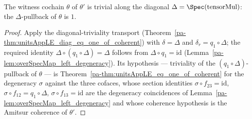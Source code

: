 \begin{theorem}
  \label{pa-thm:witnessAppLE_diag_eq_one}
  \leanok

  The witness cochain \(\theta\) of \(\theta'\) is trivial along the diagonal \(\Delta =
  \Spec(\mathrm{tensorMul})\): the \(\Delta\)-pullback of \(\theta\) is \(1\).
\end{theorem}
\begin{proof}
  \leanok
  Apply the diagonal-triviality transport (Theorem~\ref{pa-thm:unitsAppLE_diag_eq_one_of_coherent})
  with \(\delta = \Delta\) and \(\delta_r = q_1 \circ \Delta\); the required identity
  \(\Delta \circ (q_1 \circ \Delta) = \Delta\) follows from \(\Delta \circ q_1 = \mathrm{id}\)
  (Lemma~\ref{pa-lem:overSpecMap_left_degeneracy}). Its hypothesis — triviality of the
  \((q_1 \circ \Delta)\)-pullback of \(\theta\) — is
  Theorem~\ref{pa-thm:unitsAppLE_eq_one_of_coherent} for the degeneracy \(\sigma\) against the
  three cofaces, whose section identities \(\sigma \circ f_{23} = \mathrm{id}\),
  \(\sigma \circ f_{12} = q_1 \circ \Delta\), \(\sigma \circ f_{13} = \mathrm{id}\) are the
  degeneracy coincidences of Lemma~\ref{pa-lem:overSpecMap_left_degeneracy} and whose coherence
  hypothesis is the Amitsur coherence of \(\theta'\).
\end{proof}

